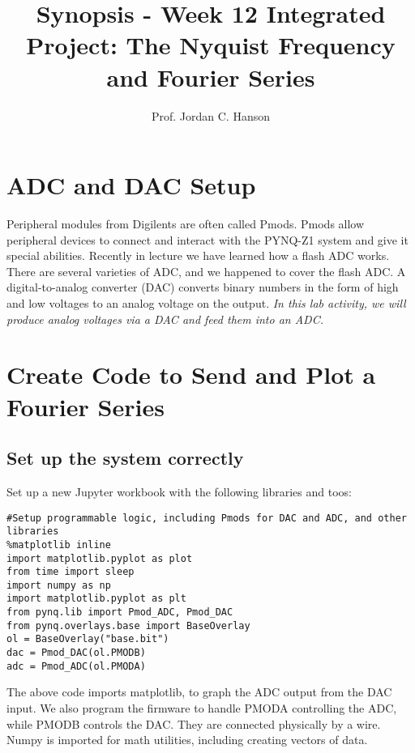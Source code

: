 \documentclass{article}
\begin{document}
\title{Synopsis - Week 12 Integrated Project: The Nyquist Frequency and Fourier Series}
\author{Prof. Jordan C. Hanson}

\maketitle

\section{ADC and DAC Setup}

Peripheral modules from Digilents are often called Pmods.  Pmods allow peripheral devices to connect and interact with the PYNQ-Z1 system and give it special abilities.  Recently in lecture we have learned how a flash ADC works.  There are several varieties of ADC, and we happened to cover the flash ADC.  A digital-to-analog converter (DAC) converts binary numbers in the form of high and low voltages to an analog voltage on the output.  \textit{In this lab activity, we will produce analog voltages via a DAC and feed them into an ADC.}

\section{Create Code to Send and Plot a Fourier Series}

\subsection{Set up the system correctly}

Set up a new Jupyter workbook with the following libraries and toos:

\begin{verbatim}
#Setup programmable logic, including Pmods for DAC and ADC, and other libraries
%matplotlib inline
import matplotlib.pyplot as plot
from time import sleep
import numpy as np
import matplotlib.pyplot as plt
from pynq.lib import Pmod_ADC, Pmod_DAC
from pynq.overlays.base import BaseOverlay
ol = BaseOverlay("base.bit")
dac = Pmod_DAC(ol.PMODB)
adc = Pmod_ADC(ol.PMODA)
\end{verbatim}

The above code imports matplotlib, to graph the ADC output from the DAC input.  We also program the firmware to handle PMODA controlling the ADC, while PMODB controls the DAC.  They are connected physically by a wire.  Numpy is imported for math utilities, including creating vectors of data.
\end{document}
